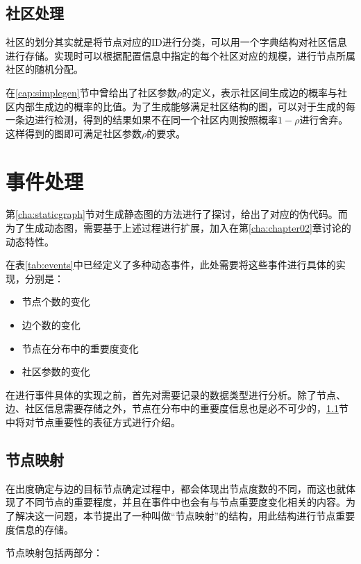\subsection{社区处理}
\label{cha:Community}

社区的划分其实就是将节点对应的ID进行分类，可以用一个字典结构对社区信息进行存储。实现时可以根据配置信息中指定的每个社区对应的规模，进行节点所属社区的随机分配。

在\ref{cap:simplegen}节中曾给出了社区参数$\rho$的定义，表示社区间生成边的概率与社区内部生成边的概率的比值。为了生成能够满足社区结构的图，可以对于生成的每一条边进行检测，得到的结果如果不在同一个社区内则按照概率$1-\rho$进行舍弃。这样得到的图即可满足社区参数$\rho$的要求。

\section{事件处理}

第\ref{cha:staticgraph}节对生成静态图的方法进行了探讨，给出了对应的伪代码。而为了生成动态图，需要基于上述过程进行扩展，加入在第\ref{cha:chapter02}章讨论的动态特性。

在表\ref{tab:events}中已经定义了多种动态事件，此处需要将这些事件进行具体的实现，分别是：

\begin{itemize}
  \item 节点个数的变化
  \item 边个数的变化
  \item 节点在分布中的重要度变化
  \item 社区参数的变化
\end{itemize}

\vspace{0.2cm}

在进行事件具体的实现之前，首先对需要记录的数据类型进行分析。除了节点、边、社区信息需要存储之外，节点在分布中的重要度信息也是必不可少的，\ref{cha:node_map}节中将对节点重要性的表征方式进行介绍。

\subsection{节点映射}
\label{cha:node_map}

在出度确定与边的目标节点确定过程中，都会体现出节点度数的不同，而这也就体现了不同节点的重要程度，并且在事件中也会有与节点重要度变化相关的内容。为了解决这一问题，本节提出了一种叫做“节点映射”的结构，用此结构进行节点重要度信息的存储。

节点映射包括两部分：

